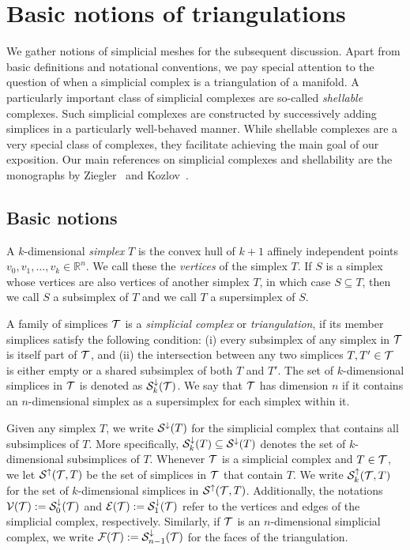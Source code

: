 \documentclass[a4paper]{amsart}
\begin{document}
\section{Basic notions of triangulations}\label{section:triangulations}

We gather notions of simplicial meshes for the subsequent discussion. 
Apart from basic definitions and notational conventions, we pay special attention to the question of when a simplicial complex is a triangulation of a manifold. 
A particularly important class of simplicial complexes are so-called \emph{shellable} complexes. Such simplicial complexes are constructed by successively adding simplices in a particularly well-behaved manner. While shellable complexes are a very special class of complexes, they facilitate achieving the main goal of our exposition.
Our main references on simplicial complexes and shellability are the monographs by Ziegler~\cite{ziegler2012lectures} and Kozlov~\cite{kozlov2008combinatorial}. 

\subsection{Basic notions}

A ${k}$-dimensional \emph{simplex} $T$ is the convex hull of ${k}+1$ affinely independent points $v_0, v_1, \ldots, v_{{k}} \in \mathbb{R}^{n}$. We call these the \emph{vertices} of the simplex $T$. 
If $S$ is a simplex whose vertices are also vertices of another simplex $T$, in which case $S \subseteq T$, 
then we call $S$ a subsimplex of $T$ and we call $T$ a supersimplex of $S$. 

A family of simplices ${\mathcal T}$ is a \emph{simplicial complex} or \emph{triangulation}, if its member simplices satisfy the following condition: 
(i) every subsimplex of any simplex in ${\mathcal T}$ is itself part of ${\mathcal T}$, and (ii) the intersection between any two simplices $T, T' \in {\mathcal T}$ is either empty or a shared subsimplex of both $T$ and $T'$. 
The set of $k$-dimensional simplices in ${\mathcal T}$ is denoted as ${\mathcal S}^{\downarrow}_{{k}}({\mathcal T})$. 
We say that ${\mathcal T}$ has dimension $n$ if it contains an $n$-dimensional simplex as a supersimplex for each simplex within it. 

Given any simplex $T$, we write ${\mathcal S}^{\downarrow}(T)$ for the simplicial complex that contains all subsimplices of $T$. 
More specifically, ${\mathcal S}^{\downarrow}_{{k}}(T) \subseteq {\mathcal S}^{\downarrow}(T)$ denotes the set of $k$-dimensional subsimplices of $T$. 
Whenever ${\mathcal T}$ is a simplicial complex and $T \in {\mathcal T}$, we let ${\mathcal S}^{\uparrow}({\mathcal T},T)$ be the set of simplices in ${\mathcal T}$ that contain $T$.
We write ${\mathcal S}^{\uparrow}_{k}({\mathcal T},T)$ for the set of $k$-dimensional simplices in ${\mathcal S}^{\uparrow}({\mathcal T},T)$. 
Additionally, the notations ${\mathcal V}({\mathcal T}) := {\mathcal S}^{\downarrow}_{0}({\mathcal T})$ and ${\mathcal E}({\mathcal T}) := {\mathcal S}^{\downarrow}_{1}({\mathcal T})$ refer to the vertices and edges of the simplicial complex, respectively. Similarly, if ${\mathcal T}$ is an $n$-dimensional simplicial complex, we write ${\mathcal F}({\mathcal T}) := {\mathcal S}^{\downarrow}_{n-1}({\mathcal T})$ for the faces of the triangulation. 
\end{document}
